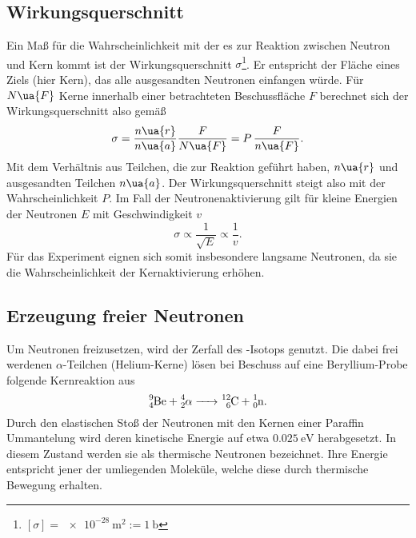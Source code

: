 \subsection{Wirkungsquerschnitt}
Ein Maß für die Wahrscheinlichkeit mit der es zur Reaktion zwischen Neutron und Kern kommt ist der Wirkungsquerschnitt
$\sigma$\footnote{$[\sigma] = \SI{e-28}{\meter^2} := \SI{1}{\barn}$}. Er entspricht
der Fläche eines Ziels (hier Kern), das alle ausgesandten Neutronen einfangen würde. Für $N\ua{F}$ Kerne innerhalb einer betrachteten Beschussfläche
$F$ berechnet sich der Wirkungsquerschnitt also gemäß
\begin{equation}
  \sigma = \frac{n\ua{r}}{n\ua{a}}\frac{F}{N\ua{F}} = P \,\frac{F}{n\ua{F}}.
\end{equation}
Mit dem Verhältnis aus Teilchen, die zur Reaktion geführt haben, $n\ua{r}$ und ausgesandten Teilchen $n\ua{a}$. Der Wirkungsquerschnitt steigt also
mit der Wahrscheinlichkeit $P$. Im Fall der Neutronenaktivierung gilt für kleine Energien der Neutronen $E$ mit Geschwindigkeit $v$
\begin{equation}
  \sigma \propto \frac{1}{\sqrt{E}} \propto \frac{1}{v}.
\end{equation}
Für das Experiment eignen sich somit insbesondere langsame Neutronen, da sie die Wahrscheinlichkeit der Kernaktivierung erhöhen.

\subsection{Erzeugung freier Neutronen}
Um Neutronen freizusetzen, wird der Zerfall des -Isotops genutzt.
Die dabei frei werdenen $\alpha$-Teilchen (Helium-Kerne) lösen bei Beschuss auf eine Beryllium-Probe
folgende Kernreaktion aus
\begin{equation}
  \ce{^9_4 Be + ^4_2}\alpha \ce{-> ^12_6C + ^1_0 n}.
\end{equation}
Durch den elastischen Stoß der Neutronen mit den Kernen einer Paraffin Ummantelung wird deren kinetische Energie
auf etwa $\SI{0.025}{\eV}$ herabgesetzt. In diesem Zustand werden sie als thermische Neutronen bezeichnet. Ihre
Energie entspricht jener der umliegenden Moleküle, welche diese durch thermische Bewegung erhalten.

